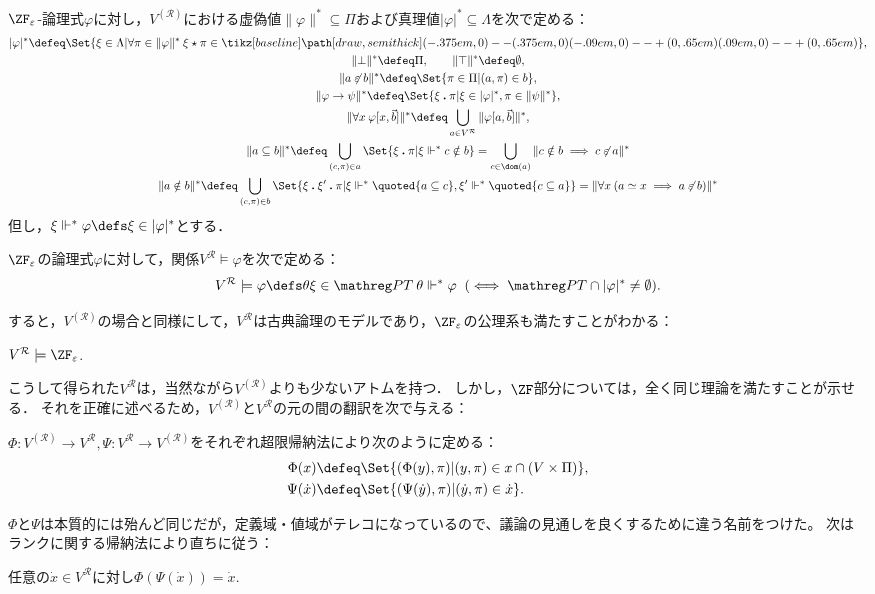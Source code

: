 \documentclass[realisability.tex]{subfiles}
\begin{document}
\begin{definition}
 $\ZFe$-論理式$\varphi$に対し，$V^{(\mathcal{R})}$における虚偽値$\|\varphi\|^* \subseteq \Pi$および真理値$|\varphi|^* \subseteq \Lambda$を次で定める：
\begin{gather*}
  |\varphi|^* \defeq \Set{ \xi \in \Lambda | \forall \pi \in \|\varphi\|^* \: \xi \cons \pi \in \pole},\\
  \|\bot\|^* \defeq \Pi,\qquad \|\top\|^* \defeq \emptyset, \\
  \|a \strnin b\|^* \defeq \Set{ \pi \in \Pi | (a, \pi) \in b},\\
  \|\varphi \to \psi\|^* \defeq \Set{ \xi \push \pi | {\xi \in |\varphi|^*, \pi \in \|\psi\|^*}},\\
  \|\forall x \: \varphi[x, \vec{b}]\|^* \defeq \bigcup_{a \in V^{\mathcal{R}}} \| \varphi[a, \vec{b}]\|^*,\\
  \| a \subseteq b \|^* \defeq \bigcup_{(c, \pi) \in a} \Set{ \xi \push \pi | \xi \Vdash^* c \notin b}
  = \bigcup_{c \in \dom(a)} \|c \notin b \implies c \strnin a\|^*\\
  \| a \notin b \|^* \defeq \bigcup_{(c, \pi) \in b} \Set{ \xi \push \xi' \push \pi | \xi \Vdash^* \quoted{a \subseteq c}, \xi' \Vdash^* \quoted{c \subseteq a}}
   = \|\forall x \: (a \simeq x \implies a \strnin b)\|^*
 \end{gather*}
 但し，$\xi \Vdash^* \varphi \defs \xi \in |\varphi|^*$とする．

 $\ZF_{\varepsilon}$の論理式$\varphi$に対して，関係$V^{\mathcal{R}} \models \varphi$を次で定める：
 \[
  V^{\mathcal{R}} \models \varphi \defs \theta \xi \in \PT\: \theta \Vdash^* \varphi \mathrel{}(\iff \PT \cap |\varphi|^* \neq \emptyset).
 \]
\end{definition}
すると，$V^{(\mathcal{R})}$の場合と同様にして，$V^{\mathcal{R}}$は古典論理のモデルであり，$\ZFe$の公理系も満たすことがわかる：
\begin{theorem}\label{thm:name-model-ZFe}
 $V^{\mathcal{R}} \models \ZFe$.
\end{theorem}

こうして得られた$V^{\mathcal{R}}$は，当然ながら$V^{(\mathcal{R})}$よりも少ないアトムを持つ．
しかし，$\ZF$部分については，全く同じ理論を満たすことが示せる．
それを正確に述べるため，$V^{(\mathcal{R})}$と$V^{\mathcal{R}}$の元の間の翻訳を次で与える：
\begin{definition}
 $\Phi: V^{(\mathcal{R})} \to V^{\mathcal{R}}, \Psi: V^{\mathcal{R}} \to V^{(\mathcal{R})}$をそれぞれ超限帰納法により次のように定める：
 \begin{align*}
  \Phi(x) &\defeq \Set{ (\Phi(y), \pi) | (y, \pi) \in x \cap (V \times \Pi)},\\
  \Psi(\dot{x}) &\defeq \Set{ (\Psi(\dot{y}), \pi) | (\dot{y}, \pi) \in \dot{x}}.
 \end{align*}
\end{definition}
$\Phi$と$\Psi$は本質的には殆んど同じだが，定義域・値域がテレコになっているので、議論の見通しを良くするために違う名前をつけた。
次はランクに関する帰納法により直ちに従う：
\begin{lemma}\label{lem:phi-of-psi}
 任意の$\dot{x} \in V^{\mathcal{R}}$に対し$\Phi(\Psi(\dot{x})) = \dot{x}$.
\end{lemma}
\end{document}

